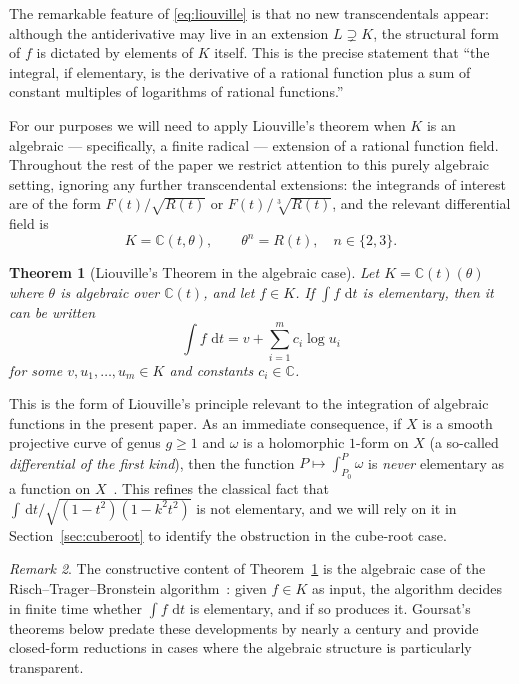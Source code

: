 \documentclass[11pt,a4paper]{article}
\theoremstyle{plain}
\newtheorem{theorem}{Theorem}[section]
\theoremstyle{definition}
\theoremstyle{remark}
\newtheorem{remark}[theorem]{Remark}
\newcommand{\C}{\mathbb{C}}
\renewcommand{\d}{\,\mathrm{d}}
\begin{document}
The remarkable feature of \eqref{eq:liouville} is that no new transcendentals appear: although the antiderivative may live in an extension $L\supsetneq K$, the structural form of $f$ is dictated by elements of $K$ itself. This is the precise statement that ``the integral, if elementary, is the derivative of a rational function plus a sum of constant multiples of logarithms of rational functions.''

For our purposes we will need to apply Liouville's theorem when $K$ is an algebraic --- specifically, a finite radical --- extension of a rational function field. Throughout the rest of the paper we restrict attention to this purely algebraic setting, ignoring any further transcendental extensions: the integrands of interest are of the form $F(t)/\sqrt{R(t)}$ or $F(t)/\sqrt[3]{R(t)}$, and the relevant differential field is
\[
  K = \C(t,\theta), \qquad \theta^n = R(t),\quad n\in\{2,3\}.
\]

\begin{theorem}[Liouville's Theorem in the algebraic case]\label{thm:liouville-alg}
Let $K = \C(t)(\theta)$ where $\theta$ is algebraic over $\C(t)$, and let $f\in K$. If $\int f\,\d t$ is elementary, then it can be written
\[
  \int f\,\d t = v + \sum_{i=1}^m c_i \log u_i
\]
for some $v, u_1,\dots,u_m \in K$ and constants $c_i \in \C$.
\end{theorem}

This is the form of Liouville's principle relevant to the integration of algebraic functions in the present paper. As an immediate consequence, if $X$ is a smooth projective curve of genus $g\geq 1$ and $\omega$ is a holomorphic $1$-form on $X$ (a so-called \emph{differential of the first kind}), then the function $P\mapsto \int_{P_0}^P \omega$ is \emph{never} elementary as a function on $X$~\cite{Bronstein2005,Trager1984}. This refines the classical fact that $\int \d t/\sqrt{(1-t^2)(1-k^2t^2)}$ is not elementary, and we will rely on it in Section~\ref{sec:cuberoot} to identify the obstruction in the cube-root case.

\begin{remark}
The constructive content of Theorem~\ref{thm:liouville-alg} is the algebraic case of the Risch--Trager--Bronstein algorithm~\cite{Risch1969,Risch1970,Davenport1981,Trager1984,Bronstein2005}: given $f\in K$ as input, the algorithm decides in finite time whether $\int f\,\d t$ is elementary, and if so produces it. Goursat's theorems below predate these developments by nearly a century and provide closed-form reductions in cases where the algebraic structure is particularly transparent.
\end{remark}
\end{document}
